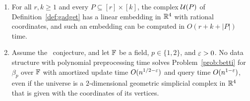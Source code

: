 \begin{theorem}\label{thm:r4}
\leavevmode
\begin{enumerate}[label=(\roman*)]
\item For all $r,k\ge1$ and every $P\subseteq[r]\times[k]$, the complex $\mathcal{U}(P)$ of Definition~\ref{def:gadget} has a linear embedding in $\mathbb{R}^4$ with rational coordinates, and such an embedding can be computed in ${O(r+k+|P|)}$ time.
\item Assume the \OMv\ conjecture, and let $\mathbb{F}$ be a field, $p\in\{1,2\}$, and $\varepsilon>0$.
No data structure with polynomial preprocessing time solves Problem~\ref{prob:betti} for $\beta_p$ over $\mathbb{F}$ with amortized update time $O(n^{1/2-\varepsilon})$ and query time $O(n^{1-\varepsilon})$, even if the universe is a $2$-dimensional geometric simplicial complex in $\mathbb{R}^4$ that is given with the coordinates of its vertices.
\end{enumerate}
\end{theorem}

